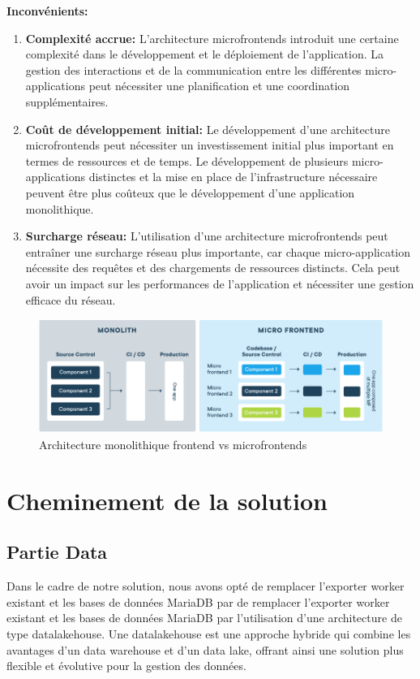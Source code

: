 \textbf{Inconvénients:}
\begin{enumerate}
    \item \textbf{Complexité accrue:} L'architecture microfrontends introduit une certaine complexité dans le développement et le déploiement de l'application. La gestion des interactions et de la communication entre les différentes micro-applications peut nécessiter une planification et une coordination supplémentaires.
    \item \textbf{Coût de développement initial:} Le développement d'une architecture microfrontends peut nécessiter un investissement initial plus important en termes de ressources et de temps. Le développement de plusieurs micro-applications distinctes et la mise en place de l'infrastructure nécessaire peuvent être plus coûteux que le développement d'une application monolithique.
    \item \textbf{Surcharge réseau:} L'utilisation d'une architecture microfrontends peut entraîner une surcharge réseau plus importante, car chaque micro-application nécessite des requêtes et des chargements de ressources distincts. Cela peut avoir un impact sur les performances de l'application et nécessiter une gestion efficace du réseau.
\end{enumerate}

\cite{microfrontends}

\begin{figure}[H]
\centering
\includegraphics[width=\linewidth]{images/micro-frontend-vs-monolith-frontend.png}
\caption{Architecture monolithique frontend vs microfrontends}\label{fig:monolithfrontendvsmicrofrontends}
\end{figure}

\section{Cheminement de la solution}
\subsection{Partie Data}
Dans le cadre de notre solution, nous avons opté de remplacer l'exporter worker existant et les bases de données MariaDB par de remplacer l'exporter worker existant et les bases de données MariaDB par l'utilisation d'une architecture de type datalakehouse. Une datalakehouse est une approche hybride qui combine les avantages d'un data warehouse et d'un data lake, offrant ainsi une solution plus flexible et évolutive pour la gestion des données.


